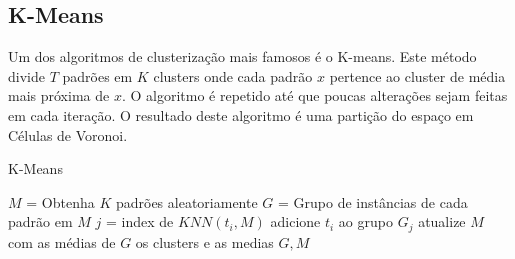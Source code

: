 \subsection{K-Means}

Um dos algoritmos de clusterização mais famosos é o K-means. Este método divide $T$ padrões em $K$ clusters onde cada padrão $x$ pertence ao cluster de média mais próxima de $x$. O algoritmo é repetido até que poucas alterações sejam feitas em cada iteração. O resultado deste algoritmo é uma partição do espaço em Células de Voronoi.

\begin{algorithm}[H]
\caption{K-Means}
\label{alg:kmeans}
\begin{algorithmic}[1]
\STATE  $M$ = Obtenha $K$ padrões aleatoriamente
\STATE  $G$ = Grupo de instâncias de cada padrão em $M$
\STATE  $j$ = index de $KNN(t_i, M)$
\STATE  adicione $t_i$ ao grupo $G_j$
\ENDFOR
\STATE atualize $M$ com as médias de $G$
\ENDWHILE
\RETURN os clusters e as medias $G, M$
\end{algorithmic}
\end{algorithm}



